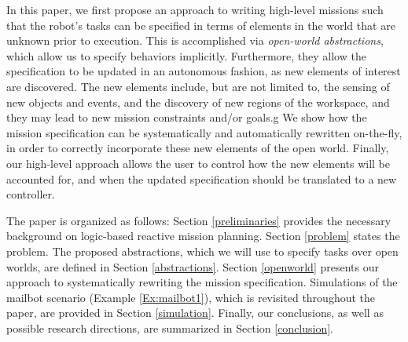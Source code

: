 In this paper, we first propose an approach to writing high-level missions such that the robot's tasks can be specified in terms of elements in the world that are unknown prior to execution. This is accomplished via \emph{open-world abstractions}, which allow us to specify behaviors implicitly. 
Furthermore, they allow the specification to be updated in an autonomous fashion, as new elements of interest are discovered. The new elements include, but are not limited to, the sensing of new objects and events, and the discovery of new regions of the workspace, and they may lead to new mission constraints and/or goals.g
We show how the mission specification can be systematically and automatically rewritten on-the-fly, in order to correctly incorporate these new elements of the open world. 
Finally, our high-level approach allows the user to control how the new elements will be accounted for, and when the updated specification should be translated to a new controller.

The paper is organized as follows: Section \ref{preliminaries} provides the necessary background on logic-based reactive mission planning. Section \ref{problem} states the problem. The proposed abstractions, which we will use to specify tasks over open worlds, are defined in Section \ref{abstractions}. Section \ref{openworld} presents our approach to systematically rewriting the mission specification. Simulations of the mailbot scenario (Example \ref{Ex:mailbot1}), which is revisited throughout the paper, are provided in Section \ref{simulation}. Finally, our conclusions, as well as possible research directions, are summarized in Section \ref{conclusion}.

